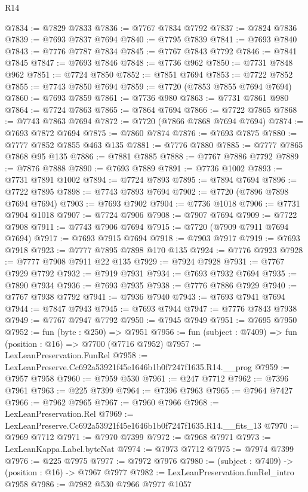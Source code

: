 \begin{lexlean}{R14}
\begin{coremodule}
@7834 := @7829 @7833
@7836 := @7767 @7834 @7792
@7837 := @7824 @7836
@7839 := @7693 @7837 @7694
@7840 := @7795 @7839
@7841 := @7693 @7840
@7843 := @7776 @7787 @7834
@7845 := @7767 @7843 @7792
@7846 := @7841 @7845
@7847 := @7693 @7846
@7848 := @7736 @962
@7850 := @7731 @7848 @962
@7851 := @7724 @7850
@7852 := @7851 @7694
@7853 := @7722 @7852
@7855 := @7743 @7850 @7694
@7859 := @7720 (@7853 @7855 @7694 @7694)
@7860 := @7693 @7859
@7861 := @7736 @980
@7863 := @7731 @7861 @980
@7864 := @7724 @7863
@7865 := @7864 @7694
@7866 := @7722 @7865
@7868 := @7743 @7863 @7694
@7872 := @7720 (@7866 @7868 @7694 @7694)
@7874 := @7693 @7872 @7694
@7875 := @7860 @7874
@7876 := @7693 @7875
@7880 := @7777 @7852 @7855 @463 @135
@7881 := @7776 @7880
@7885 := @7777 @7865 @7868 @95 @135
@7886 := @7881 @7885
@7888 := @7767 @7886 @7792
@7889 := @7876 @7888
@7890 := @7693 @7889
@7891 := @7736 @1002
@7893 := @7731 @7891 @1002
@7894 := @7724 @7893
@7895 := @7894 @7694
@7896 := @7722 @7895
@7898 := @7743 @7893 @7694
@7902 := @7720 (@7896 @7898 @7694 @7694)
@7903 := @7693 @7902
@7904 := @7736 @1018
@7906 := @7731 @7904 @1018
@7907 := @7724 @7906
@7908 := @7907 @7694
@7909 := @7722 @7908
@7911 := @7743 @7906 @7694
@7915 := @7720 (@7909 @7911 @7694 @7694)
@7917 := @7693 @7915 @7694
@7918 := @7903 @7917
@7919 := @7693 @7918
@7923 := @7777 @7895 @7898 @170 @135
@7924 := @7776 @7923
@7928 := @7777 @7908 @7911 @22 @135
@7929 := @7924 @7928
@7931 := @7767 @7929 @7792
@7932 := @7919 @7931
@7934 := @7693 @7932 @7694
@7935 := @7890 @7934
@7936 := @7693 @7935
@7938 := @7776 @7886 @7929
@7940 := @7767 @7938 @7792
@7941 := @7936 @7940
@7943 := @7693 @7941 @7694
@7944 := @7847 @7943
@7945 := @7693 @7944
@7947 := @7776 @7843 @7938
@7949 := @7767 @7947 @7792
@7950 := @7945 @7949
@7951 := @7695 @7950
@7952 := fun (byte : @250) => @7951
@7956 := fun (subject : @7409) => fun (position : @16) => @7700 (@7716 @7952)
@7957 := LexLeanPreservation.FunRel
@7958 := LexLeanPreserve.Cc692a53921f45e1646b1b0f7247f1635.R14.__prog
@7959 := @7957 @7958
@7960 := @7959 @530
@7961 := @247 @7712
@7962 := @7396 @7961
@7963 := @225 @7399
@7964 := @7396 @7963
@7965 := @7964 @7427
@7966 := @7962 @7965
@7967 := @7960 @7966
@7968 := LexLeanPreservation.Rel
@7969 := LexLeanPreserve.Cc692a53921f45e1646b1b0f7247f1635.R14.__fits_13
@7970 := @7969 @7712
@7971 := @7970 @7399
@7972 := @7968 @7971
@7973 := LexLeanKappa.Label.byteNat
@7974 := @7973 @7712
@7975 := @7974 @7399
@7976 := @225 @7975
@7977 := @7972 @7976
@7980 := (subject : @7409) -> (position : @16) -> @7967 @7977
@7982 := LexLeanPreservation.funRel_intro @7958
@7986 := @7982 @530 @7966 @7977 @1057

\end{coremodule}
\end{lexlean}
